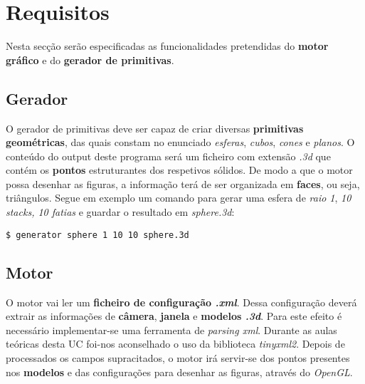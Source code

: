 \section{Requisitos}

Nesta secção serão especificadas as funcionalidades pretendidas  do \textbf{motor gráfico}
e do \textbf{gerador de primitivas}.

\subsection{Gerador}

O gerador de primitivas deve ser capaz de criar diversas \textbf{primitivas geométricas}, das quais
constam no enunciado \textit{esferas}, \textit{cubos}, \textit{cones} e \textit{planos}.
O conteúdo do output deste programa será um ficheiro com extensão \textit{.3d}
que contém os \textbf{pontos} estruturantes dos respetivos sólidos. De modo a que o motor possa
desenhar as figuras, a informação terá de ser organizada em \textbf{faces}, ou seja, triângulos.
Segue em exemplo um comando para gerar uma esfera de \textit{raio 1}, \textit{10 stacks, 10 fatias}
e guardar o resultado em \textit{sphere.3d}:
\begin{lstlisting}[style=BASH]
$ generator sphere 1 10 10 sphere.3d
\end{lstlisting}

\subsection{Motor}

O motor vai ler um \textbf{ficheiro de configuração \textit{.xml}}. Dessa configuração deverá
extrair as informações de \textbf{câmera}, \textbf{janela} e \textbf{modelos \textit{.3d}}.
Para este efeito é necessário implementar-se uma ferramenta de \textit{parsing xml}. Durante as
aulas teóricas desta UC foi-nos aconselhado o uso da biblioteca \textit{tinyxml2}.
Depois de processados os campos supracitados, o motor irá servir-se dos pontos presentes nos
\textbf{modelos} e das configurações para desenhar as figuras, através do \textit{OpenGL}.
